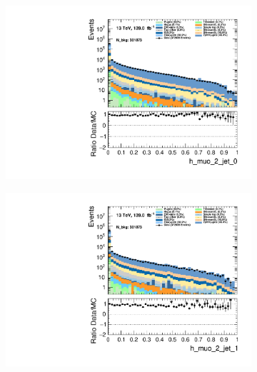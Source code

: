 \begin{figure}
\begin{subfigure}{.49\textwidth}
        \includegraphics[width=\textwidth]{Figures/MC_Data_comp/h_muo_2_jet_0.pdf}
        \caption{ }
        \label{fig:fep}
    \end{subfigure}
    \hfill
    \begin{subfigure}{.49\textwidth}
        \includegraphics[width=\textwidth]{Figures/MC_Data_comp/h_muo_2_jet_1.pdf}
        \caption{ }
        \label{fig:fe}
    \end{subfigure}
    \hfill       
    \caption{}
    \label{fig:t}
\end{figure}

